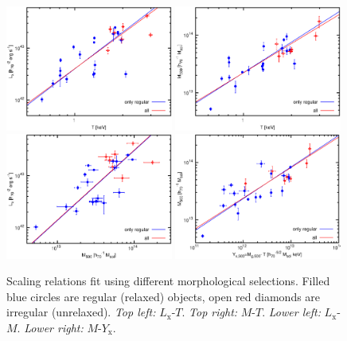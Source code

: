 \documentclass[structabstract]{aa}
\begin{document}
\begin{figure}
  \centering
  \includegraphics[width=0.49\textwidth]{lthdamorph_c.eps}\quad
  \includegraphics[width=0.49\textwidth]{mthdamorph_c.eps}\\\medskip
  \includegraphics[width=0.49\textwidth]{lmhdamorph_c.eps}\quad
   \includegraphics[width=0.49\textwidth]{yx_mmorph_c.eps}
   \caption{Scaling relations fit using different morphological
     selections. Filled blue circles are regular (relaxed) objects, open red diamonds are
     irregular (unrelaxed). \emph{Top left:} $L_{\text{x}}$-$T$. \emph{Top
       right:} $M$-$T$. \emph{Lower left:} $L_{\text{x}}$-$M$. \emph{Lower
       right:} $M$-$Y_{\text{x}}$. }
   \label{fig:morphrelation}%
\end{figure}
\end{document}
